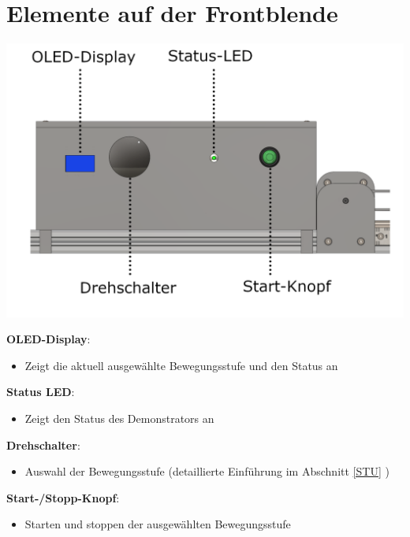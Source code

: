 %
%

\chapter{Elemente auf der Frontblende}
\begin{center}
	
	\includegraphics[width=\textwidth]{Images/Konstruktion2.png}
\end{center}

	\textbf{OLED-Display}: 
\begin{itemize}
	\item Zeigt die aktuell ausgewählte Bewegungsstufe und den Status an
\end{itemize}

	\textbf{Status LED}: 
\begin{itemize}
	\item Zeigt den Status des Demonstrators an
\end{itemize}

	\textbf{Drehschalter}: 
\begin{itemize}
	\item Auswahl der Bewegungsstufe (detaillierte Einführung im Abschnitt \ref{STU} )
\end{itemize}

	\textbf{Start-/Stopp-Knopf}: 
\begin{itemize}
	\item Starten und stoppen der ausgewählten Bewegungsstufe
\end{itemize}
